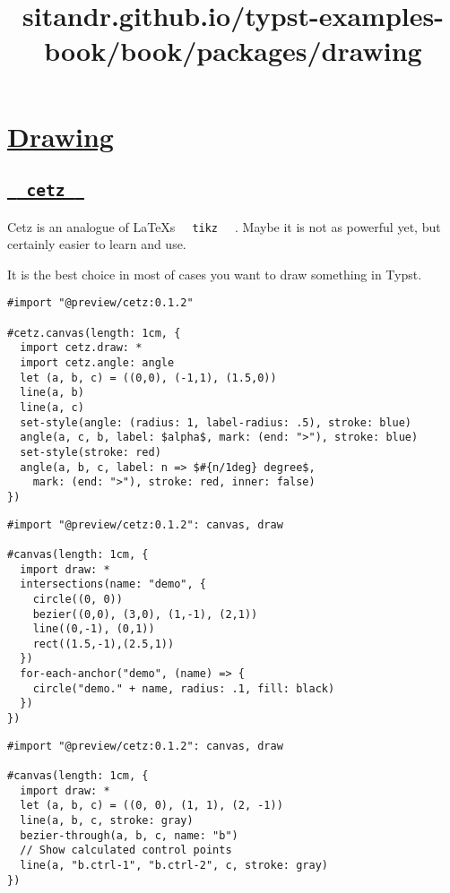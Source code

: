 \title{sitandr.github.io/typst-examples-book/book/packages/drawing}

\section{\texorpdfstring{\hyperref[drawing]{Drawing}}{Drawing}}\label{drawing}

\subsection{\texorpdfstring{\hyperref[cetz]{\texttt{\ }{\texttt{\ cetz\ }}\texttt{\ }}}{  cetz  }}\label{cetz}

Cetz is an analogue of LaTeX\textquotesingle s
\texttt{\ }{\texttt{\ tikz\ }}\texttt{\ } . Maybe it is not as powerful
yet, but certainly easier to learn and use.

It is the best choice in most of cases you want to draw something in
Typst.

\begin{verbatim}
#import "@preview/cetz:0.1.2"

#cetz.canvas(length: 1cm, {
  import cetz.draw: *
  import cetz.angle: angle
  let (a, b, c) = ((0,0), (-1,1), (1.5,0))
  line(a, b)
  line(a, c)
  set-style(angle: (radius: 1, label-radius: .5), stroke: blue)
  angle(a, c, b, label: $alpha$, mark: (end: ">"), stroke: blue)
  set-style(stroke: red)
  angle(a, b, c, label: n => $#{n/1deg} degree$,
    mark: (end: ">"), stroke: red, inner: false)
})
\end{verbatim}

\pandocbounded{}

\begin{verbatim}
#import "@preview/cetz:0.1.2": canvas, draw

#canvas(length: 1cm, {
  import draw: *
  intersections(name: "demo", {
    circle((0, 0))
    bezier((0,0), (3,0), (1,-1), (2,1))
    line((0,-1), (0,1))
    rect((1.5,-1),(2.5,1))
  })
  for-each-anchor("demo", (name) => {
    circle("demo." + name, radius: .1, fill: black)
  })
})
\end{verbatim}

\pandocbounded{}

\begin{verbatim}
#import "@preview/cetz:0.1.2": canvas, draw

#canvas(length: 1cm, {
  import draw: *
  let (a, b, c) = ((0, 0), (1, 1), (2, -1))
  line(a, b, c, stroke: gray)
  bezier-through(a, b, c, name: "b")
  // Show calculated control points
  line(a, "b.ctrl-1", "b.ctrl-2", c, stroke: gray)
})
\end{verbatim}

